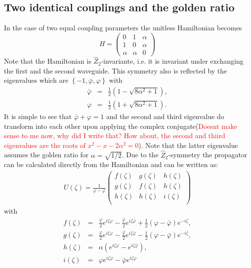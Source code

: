 \documentclass[9pt,twocolumn,twoside]{osajnl}
\begin{document}
\subsection{Two identical couplings and the golden ratio}
In the case of two equal coupling parameters the unitless Hamiltonian becomes
\begin{equation}
H=\left( \begin{array}{ccc}
0 & 1 & \alpha \\
1 & 0 & \alpha \\
\alpha & \alpha & 0 \end{array} \right)	 
\end{equation}
Note that the Hamiltonian is  $\hat{Z}_2$-invariante, i.e. it is invariant under exchanging the first and the second waveguide.
This symmetry also is reflected by the eigenvalues which are  $\left\{-1, \bar{\varphi}, \varphi  \right\}$ with
\begin{eqnarray}
\bar{\varphi} &=& \frac{1}{2} \left(1-\sqrt{8 \alpha ^2+1}\right),\\
\varphi &=& \frac{1}{2} \left( 1 + \sqrt{8 \alpha ^2+1} \right).
\end{eqnarray}
It is simple to see that $\bar{\varphi} + \varphi = 1$ and the second and third eigenvalue do transform into 
each other upon applying the complex conjugate(\textcolor{red}{Doesnt make sense to me now, why did I write that? How about, the second
	and thiird eigenvalues are the roots of $x^2-x-2\alpha^2=0$}). Note that the latter eigenvalue 
assumes the golden ratio for $\alpha = \sqrt{1/2}$.
Due to the $\hat{Z}_2$-symmetry the propagator can be calculated directly from the Hamiltonian and can be written as:
\begin{eqnarray}
U(\zeta) = \frac{1}{\varphi -\bar{\varphi}} \left(
\begin{array}{ccc}
f(\zeta) & g(\zeta) &  h(\zeta)\\
g(\zeta) & f(\zeta) & h(\zeta) \\
h(\zeta) & h(\zeta) & i(\zeta) \\
\end{array}
\right)\label{eq:prop2}
\end{eqnarray}
 with
 \begin{eqnarray}
f(\zeta) &=& \frac{\varphi}{2} e^{i \zeta \varphi} -\frac{\bar{\varphi}}{2} e^{i \zeta \bar{\varphi} }
 + \frac{1}{2} \left( \varphi -\bar{\varphi} \right) e^{-i \zeta}, \label{eq:ticF1}\\
g(\zeta) &=& \frac{\varphi}{2} e^{i \zeta \varphi } - \frac{\bar{\varphi}}{2} e^{i \zeta \bar{\varphi} } - \frac{1}{2} \left( \varphi -\bar{\varphi}\right)  e^{-i \zeta}, \\
h(\zeta) &=& \alpha \left(  e^{i \zeta \varphi }  -  e^{i \zeta \bar{\varphi} } \right),\\
i(\zeta) &=&   \varphi e^{i \zeta \bar{\varphi} } - \bar{\varphi}  e^{i \zeta \varphi } \label{eq:ticF2} 
\end{eqnarray}
\end{document}
